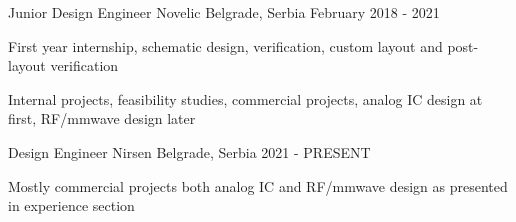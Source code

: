 


\begin{cventries}


\cventry
{Junior Design Engineer} %
{Novelic} %
{Belgrade, Serbia} %
{February 2018 - 2021} %
{ %
\begin{cvitems}
    \item First year internship, schematic design, verification, custom layout and post-layout verification
    \item Internal projects, feasibility studies, commercial projects, analog IC design at first, RF/mmwave design later
\end{cvitems}
}


\cventry
{Design Engineer} %
{Nirsen} %
{Belgrade, Serbia} %
{2021 - PRESENT} %
{ %
\begin{cvitems}
    \item Mostly commercial projects both analog IC and RF/mmwave design as presented in experience section
\end{cvitems}
}


\end{cventries}